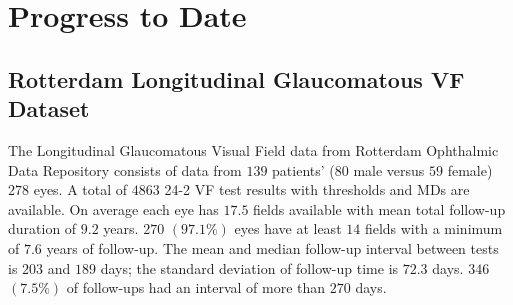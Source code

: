\chapter{Progress to Date}

\section{Rotterdam Longitudinal Glaucomatous \ac{VF} Dataset}

The Longitudinal Glaucomatous Visual Field data from Rotterdam Ophthalmic Data Repository \cite{Bryan2013} consists of data from $139$ patients' ($80$ male versus $59$ female) $278$ eyes. A total of $4863$ 24-2 \ac{VF} test results with thresholds and \acp{MD} are available. On average each eye has $17.5$ fields available with mean total follow-up duration of $9.2$ years. $270$ $(97.1\%)$ eyes have at least $14$ fields with a minimum of $7.6$ years of follow-up. The mean and median follow-up interval between tests is $203$ and $189$ days; the standard deviation of follow-up time is $72.3$ days. $346$ $(7.5\%)$ of follow-ups had an interval of more than $270$ days. 



